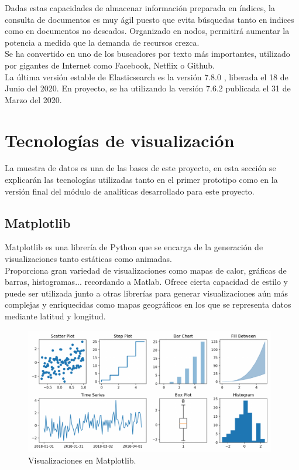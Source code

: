 \documentclass[11pt,a4paper]{book}
\begin{document}
				Dadas estas capacidades de almacenar información preparada en índices, la consulta de documentos es muy ágil puesto que evita búsquedas tanto en indices como en documentos no deseados. Organizado en nodos, permitirá aumentar la potencia a medida que la demanda de recursos crezca. \\
				
				Se ha convertido en uno de los buscadores por texto más importantes, utilizado por gigantes de Internet como Facebook, Netflix o Github. \\
				
				La última versión estable de Elasticsearch es la versión 7.8.0 \cite{versions_elasticsearch}, liberada el 18 de Junio del 2020. En proyecto, se ha utilizando la versión 7.6.2 publicada el 31 de Marzo del 2020.


		
		\section{Tecnologías de visualización}
			La muestra de datos es una de las bases de este proyecto, en esta sección se explicarán las tecnologías utilizadas tanto en el primer prototipo como en la versión final del módulo de analíticas desarrollado para este proyecto.
			
			\subsection{Matplotlib}
				Matplotlib es una librería de Python que se encarga de la generación de visualizaciones tanto estáticas como animadas. \\
				
				Proporciona gran variedad de visualizaciones como mapas de calor, gráficas de barras, histogramas... recordando a Matlab. Ofrece cierta capacidad de estilo y puede ser utilizada junto a otras librerías para generar visualizaciones aún más complejas y enriquecidas como mapas geográficos en los que se representa datos mediante latitud y longitud. \\
				
				\begin{figure}[H]
					\centering
					\includegraphics[width=11cm, keepaspectratio]{img/visualizations_matplotlib.png}
					\caption{Visualizaciones en Matplotlib.}
					\label{fig:visualizations_matplotlib}
				\end{figure}
			
\end{document}
